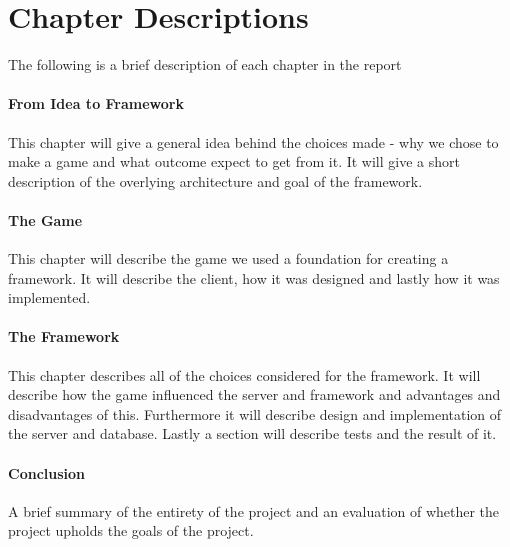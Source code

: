 \section{Chapter Descriptions}
The following is a brief description of each chapter in the report

\paragraph{From Idea to Framework}
This chapter will give a general idea behind the choices made - why we chose to make a game and what outcome expect to get from it. It will give a short description of the overlying architecture and goal of the framework. 
\paragraph{The Game}
This chapter will describe the game we used a foundation for creating a framework. It will describe the client, how it was designed and lastly how it was implemented.
\paragraph{The Framework}
This chapter describes all of the choices considered for the framework. It will describe how the game influenced the server and framework and advantages and disadvantages of this. Furthermore it will describe design and implementation of the server and database. Lastly a section will describe tests and the result of it.
\paragraph{Conclusion}
A brief summary of the entirety of the project and an evaluation of whether the project upholds the goals of the project.
